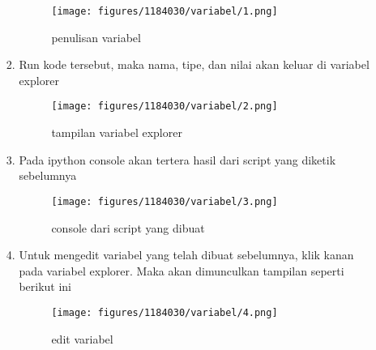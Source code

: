 \begin{enumerate}
\begin{itemize}
\begin{enumerate}
			\begin{figure}[H]
			\texttt{[image: figures/1184030/variabel/1.png]}
			\centering
			\caption{penulisan variabel}
			\end{figure}
		\item Run kode tersebut, maka nama, tipe, dan nilai akan keluar di variabel explorer
			\begin{figure}[H]
			\texttt{[image: figures/1184030/variabel/2.png]}
			\centering
			\caption{tampilan variabel explorer}
			\end{figure}
		\item Pada ipython console akan tertera hasil dari script yang diketik sebelumnya
			\begin{figure}[H]
			\texttt{[image: figures/1184030/variabel/3.png]}
			\centering
			\caption{console dari script yang dibuat}
			\end{figure}
		\item Untuk mengedit variabel yang telah dibuat sebelumnya, klik kanan pada variabel explorer. Maka akan dimunculkan tampilan seperti berikut ini
			\begin{figure}[H]
			\texttt{[image: figures/1184030/variabel/4.png]}
			\centering
			\caption{edit variabel}
			\end{figure}
		\end{enumerate}
\end{itemize}

\end{enumerate}
